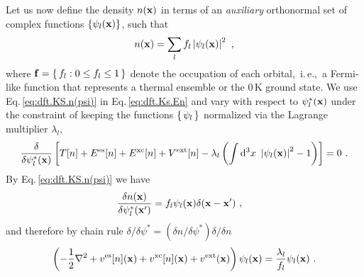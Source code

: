Let us now define the density $n({\bf x})$ in terms of an \emph{auxiliary} orthonormal set of complex functions $\{ \psi_l ({\bf x}) \}$, such that
\begin{align}
	n({\bf x}) = \sum_l f_l \left\lvert \psi_l ({\bf x}) \right\rvert^2~,
	\label{eq:dft.KS.n(psi)}
\end{align}
where ${\bf f}=\set{f_l : 0 \leq f_l \leq 1}$ denote the occupation of each orbital,~i.\,e.,~a Fermi-like function that represents a thermal ensemble or the 0\,K ground state. We use Eq.\,\eqref{eq:dft.KS.n(psi)} in Eq.\,\eqref{eq:dft.Ks.En} and vary with respect to $\psi^\ast_l ({\bf x})$ under the constraint of keeping the functions $\set{\psi_l}$ normalized via the Lagrange multiplier $\lambda_l$,
\begin{align}
	\frac{\delta}{\delta \psi^\ast_l ({\bf x})}
		\left[
			T[n] +  E^{\rm es}[n] + E^{\rm xc} [n] + V^{\rm ext}[n]
			- \lambda_l \left(
				\int {\rm d}^3 x ~ \left\lvert \psi_l ({\bf x}) \right\rvert^2 - 1
			\right)
		\right]
		= 0~.
	\label{eq:dft.Ks.variation.1}
\end{align}
By Eq.\,\eqref{eq:dft.KS.n(psi)} we have
\begin{align}
	\frac{\delta n({\bf x})}{\delta \psi^\ast_l ({\bf x}')}
		&= f_l \psi_l ({\bf x}) \delta ({\bf x} - {\bf x}')~,
	\label{eq:dft.KS.dn}
\end{align}
and therefore by chain rule 
$\delta / \delta \psi^\ast = (\delta n / \delta \psi^\ast) \delta / \delta n$
\begin{align}
	\left(
		-\frac{1}{2} \nabla^2 
		+ v^{\rm es} [n] ({\bf x})
		+ v^{\rm xc} [n] ({\bf x})
		+ v^{\rm ext}  ({\bf x})
	\right) \psi_l ({\bf x})
	= \frac{\lambda_l}{f_l} \psi_l ({\bf x})~.
	\label{eq:dft.KS.1}
\end{align}
